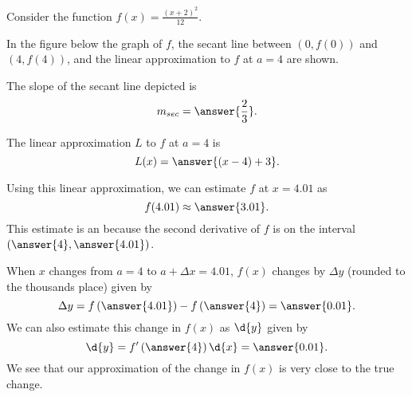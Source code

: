 \documentclass{ximera}
\author{Nela Lakos \and Kyle Parsons \and Bobby Ramsey}
\begin{document}
\begin{exercise}

Consider the function $f(x) = \frac{(x+2)^2}{12}$.

In the figure below the graph of $f$, the secant line between $(0,f(0))$ and $(4,f(4))$, and the linear approximation to $f$ at $a=4$ are shown.

\begin{image}
\end{image}

The slope of the secant line depicted is
\[
m_{sec} = \answer{\frac{2}{3}}.
\]

The linear approximation $L$ to $f$ at $a=4$ is
\[
L(x) = \answer{(x-4) + 3}.
\]

Using this linear approximation, we can estimate $f$ at $x=4.01$ as
\[
f(4.01) \approx \answer{3.01}.
\]
This estimate is an  because the second derivative of $f$ is  on the interval $\left( \answer{4}, \answer{4.01} \right)$.

When $x$ changes from $a=4$ to $a+\Delta x=4.01$, $f(x)$ changes by $\Delta y$ (rounded to the thousands place) given by
\[
\Delta y = f\left(\answer{4.01}\right) - f\left(\answer{4}\right) = \answer{0.01}.
\]
We can also estimate this change in $f(x)$ as $\d{y}$ given by
\[
\d{y} = f'\left(\answer{4}\right)\d{x} = \answer{0.01}.
\]
We see that our approximation of the change in $f(x)$ is very close to the true change.

\end{exercise}
\end{document}
